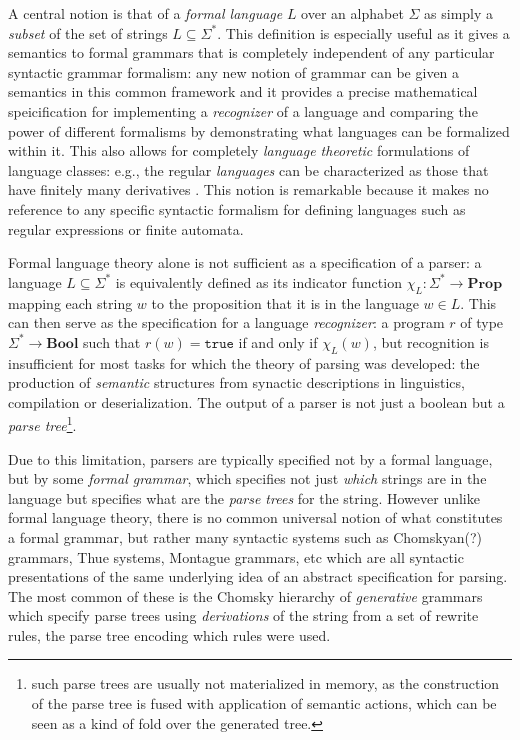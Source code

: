 \documentclass[sigconf,anonymous,review,screen]{acmart}
\newcommand{\Prop}{\mathbf{Prop}}
\newcommand{\Bool}{\mathbf{Bool}}
\begin{document}
A central notion is that of a \emph{formal language} $L$ over an
alphabet $\Sigma$ as simply a \emph{subset} of the set of strings $L
\subseteq \Sigma^*$. This definition is especially useful as it gives
a semantics to formal grammars that is completely independent of any
particular syntactic grammar formalism: any new notion of grammar can
be given a semantics in this common framework and it provides a
precise mathematical speicification for implementing a
\emph{recognizer} of a language and comparing the power of different
formalisms by demonstrating what languages can be formalized within
it. This also allows for completely \emph{language theoretic}
formulations of language classes: e.g., the regular \emph{languages}
can be characterized as those that have finitely many derivatives
\cite{brzozowski-or-myhill-nerode-idk}. This notion is remarkable
because it makes no reference to any specific syntactic formalism for
defining languages such as regular expressions or finite automata.

Formal language theory alone is not sufficient as a specification of a
parser: a language $L \subseteq \Sigma^*$ is equivalently defined as
its indicator function $\chi_L : \Sigma^* \to \Prop$ mapping each
string $w$ to the proposition that it is in the language $w \in
L$. This can then serve as the specification for a language
\emph{recognizer}: a program $r$ of type $\Sigma^* \to \Bool$ such
that $r(w) = \texttt{true}$ if and only if $\chi_L(w)$, but
recognition is insufficient for most tasks for which the theory of
parsing was developed: the production of \emph{semantic} structures
from synactic descriptions in linguistics, compilation or
deserialization. The output of a parser is not just a boolean but a
\emph{parse tree}\footnote{such parse trees are usually not
materialized in memory, as the construction of the parse tree is fused
with application of semantic actions, which can be seen as a kind of
fold over the generated tree.}.

Due to this limitation, parsers are typically specified not by a
formal language, but by some \emph{formal grammar}, which specifies
not just \emph{which} strings are in the language but specifies what
are the \emph{parse trees} for the string. However unlike formal
language theory, there is no common universal notion of what
constitutes a formal grammar, but rather many syntactic systems such
as Chomskyan(?)  grammars, Thue systems, Montague grammars, etc which
are all syntactic presentations of the same underlying idea of an
abstract specification for parsing. The most common of these is the
Chomsky hierarchy of \emph{generative} grammars which specify parse
trees using \emph{derivations} of the string from a set of rewrite
rules, the parse tree encoding which rules were used.
\end{document}
